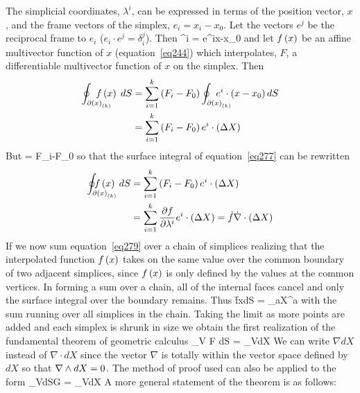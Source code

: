 The simplicial coordinates, $\lambda^{i}$, can be expressed in terms of the position vector, $x$, and the frame vectors of the 
simplex, $e_{i} = x_{i}-x_{0}$. Let the vectors $e^{j}$ be the reciprocal frame to $e_{i}$ ($e_{i}\cdot e^{j} = \delta_{i}^{j}$).  Then
\be
\lambda^{i} = e^{i}\cdot\lp x-x_{0}\rp
\ee
and let ${f}\left ( {x} \right )$ be an affine multivector function of $x$ (equation~\ref{eq244}) which interpolates, $F$, a differentiable multivector 
function of $x$ on the simplex. Then
\begin{align}
\oint_{\partial\smplx{x}{k}}\hspace{-0.25in}\f{f}{x}\;dS &= \sum_{i=1}^{k}\lp F_{i}-F_{0}\rp\oint_{\partial\smplx{x}{k}}\hspace{-0.25in}
                 e^{i}\cdot\lp x-x_{0}\rp dS \nonumber \\
                                                         &= \sum_{i=1}^{k}\lp F_{i}-F_{0}\rp e^{i}\cdot\lp\Delta X\rp\label{eq277}
\end{align}
But
\be
{} = F_{i}-F_{0}
\ee
so that the surface integral of equation~\ref{eq277} can be rewritten
\begin{align}
\oint_{\partial\smplx{x}{k}}\hspace{-0.35in}\f{f}{x}\;dS &= \sum_{i=1}^{k}\lp F_{i}-F_{0}\rp e^{i}\cdot\lp\Delta X\rp \nonumber \\
                                                         &= \sum_{i=1}^{k}\pdiff{f}{\lambda^{i}}e^{i}\cdot\lp\Delta X\rp 
                                                          = \dot{f}\dot{\nabla}\cdot\lp \Delta X\rp\label{eq279}
\end{align}
If we now sum equation~\ref{eq279} over a chain of simplices realizing that the interpolated function ${f}\left ( {x} \right )$ takes on the same value
over the common boundary of two adjacent simplices, since ${f}\left ( {x} \right )$ is only defined by the values at the common vertices.  In forming a
sum over a chain, all of the internal faces cancel and only the surface integral over the boundary remains.  Thus
\be
\oint\f{f}{x}\;dS = \sum_{a}\dot{\nabla}\cdot\lp\Delta X^{a} \rp
\ee
with the sum running over all simplices in the chain.  Taking the limit as more points are added and each simplex is shrunk in size we obtain
the first realization of the fundamental theorem of geometric calculus
\be\label{FTGC0}
\oint_{\partial V} F\; dS = \int_{V}\dot{\nabla}\;dX
\ee
We can write $\nabla dX$ instead of $\nabla \cdot dX$ since the vector $\nabla$ is totally within the vector space defined by $dX$ so that
$\nabla\wedge dX=0$.
The method of proof used can also be applied to the form
\be\label{FTGC1}
\oint_{\partial V}dS\;G = \int_{V}\dot{\nabla}\;dX\;
\ee
A more general statement of the theorem is as follows:

